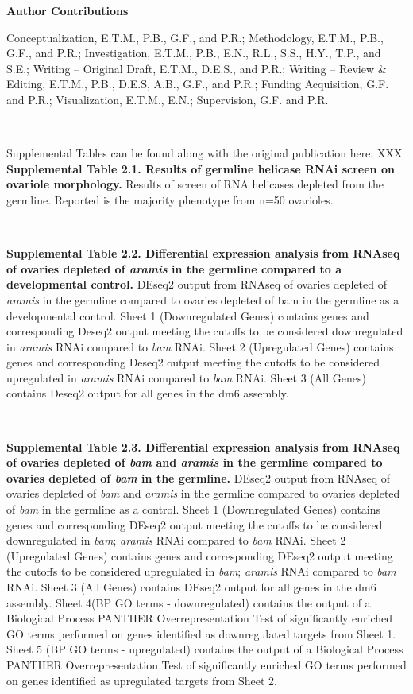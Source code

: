 \documentclass[12pt,oneside]{reedthesis}
\begin{document}
\textbf{Author Contributions}

Conceptualization, E.T.M., P.B., G.F., and P.R.; Methodology, E.T.M., P.B., G.F., and P.R.; Investigation, E.T.M., P.B., E.N., R.L., S.S., H.Y., T.P., and S.E.; Writing -- Original Draft, E.T.M., D.E.S., and P.R.; Writing -- Review \& Editing, E.T.M., P.B., D.E.S, A.B., G.F., and P.R.; Funding Acquisition, G.F. and P.R.; Visualization, E.T.M., E.N.; Supervision, G.F. and P.R.

\textbf{\\
}

Supplemental Tables can be found along with the original publication here: XXX\\

\textbf{Supplemental Table 2.1. Results of germline helicase RNAi screen on ovariole morphology.}
Results of screen of RNA helicases depleted from the germline. Reported is the majority phenotype from n=50 ovarioles.

\textbf{\\
}

\textbf{Supplemental Table 2.2. Differential expression analysis from RNAseq of ovaries depleted of \emph{aramis} in the germline compared to a developmental control.}
DEseq2 output from RNAseq of ovaries depleted of \emph{aramis} in the germline compared to ovaries depleted of bam in the germline as a developmental control. Sheet 1 (Downregulated Genes) contains genes and corresponding Deseq2 output meeting the cutoffs to be considered downregulated in \emph{aramis} RNAi compared to \emph{bam} RNAi. Sheet 2 (Upregulated Genes) contains genes and corresponding Deseq2 output meeting the cutoffs to be considered upregulated in \emph{aramis} RNAi compared to \emph{bam} RNAi. Sheet 3 (All Genes) contains Deseq2 output for all genes in the dm6 assembly.

\textbf{\\
}

\textbf{Supplemental Table 2.3. Differential expression analysis from RNAseq of ovaries depleted of \emph{bam} and \emph{aramis} in the germline compared to ovaries depleted of \emph{bam} in the germline.}
DEseq2 output from RNAseq of ovaries depleted of \emph{bam} and \emph{aramis} in the germline compared to ovaries depleted of \emph{bam} in the germline as a control. Sheet 1 (Downregulated Genes) contains genes and corresponding DEseq2 output meeting the cutoffs to be considered downregulated in \emph{bam}; \emph{aramis} RNAi compared to \emph{bam} RNAi. Sheet 2 (Upregulated Genes) contains genes and corresponding DEseq2 output meeting the cutoffs to be considered upregulated in \emph{bam}; \emph{aramis} RNAi compared to \emph{bam} RNAi. Sheet 3 (All Genes) contains DEseq2 output for all genes in the dm6 assembly. Sheet 4(BP GO terms - downregulated) contains the output of a Biological Process PANTHER Overrepresentation Test of significantly enriched GO terms performed on genes identified as downregulated targets from Sheet 1. Sheet 5 (BP GO terms - upregulated) contains the output of a Biological Process PANTHER Overrepresentation Test of significantly enriched GO terms performed on genes identified as upregulated targets from Sheet 2.
\end{document}

